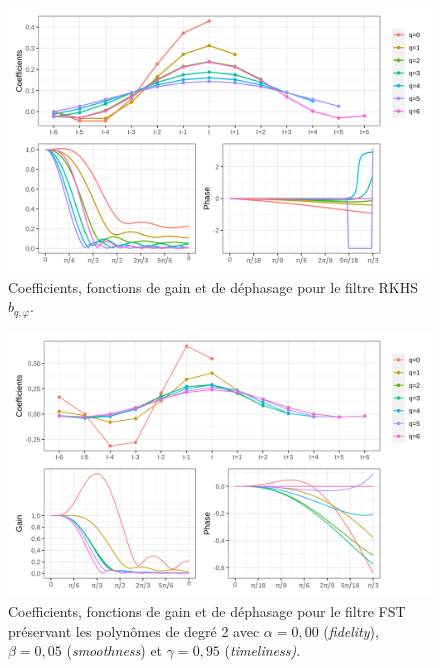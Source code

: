 \documentclass[
  12pt,
  a4paper,french]{article}
\newcommand\1{\mathds{1}}
\begin{document}
\begin{figure}[H]

{\centering \includegraphics[width=1\linewidth]{img/filters_used/phase} 

}

\caption[Coefficients, fonctions de gain et de déphasage pour le filtre RKHS \(b_{q,\varphi}\)]{Coefficients, fonctions de gain et de déphasage pour le filtre RKHS \(b_{q,\varphi}\).}\label{fig:graphsrkhsphase}

\footnotesize
\normalsize\end{figure}

\begin{figure}[H]

{\centering \includegraphics[width=1\linewidth]{img/filters_used/fst} 

}

\caption[Coefficients, fonctions de gain et de déphasage pour le filtre FST préservant les polynômes de degré 2 avec \(\alpha = 0,00\) (\emph{fidelity}), \(\beta =0,05\) (\emph{smoothness}) et \(\gamma = 0,95\) (\emph{timeliness)}]{Coefficients, fonctions de gain et de déphasage pour le filtre FST préservant les polynômes de degré 2 avec \(\alpha = 0,00\) (\emph{fidelity}), \(\beta =0,05\) (\emph{smoothness}) et \(\gamma = 0,95\) (\emph{timeliness)}.}\label{fig:graphsfst}

\footnotesize
\normalsize\end{figure}
\end{document}
